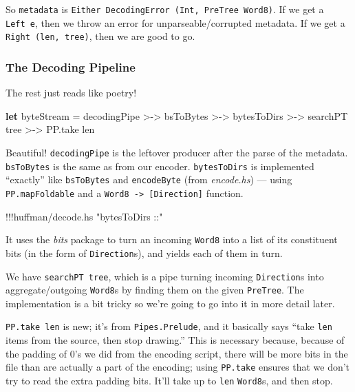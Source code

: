 \documentclass[]{article}
\newenvironment{Shaded}{}{}
\newcommand{\KeywordTok}[1]{\textcolor[rgb]{0.00,0.44,0.13}{\textbf{{#1}}}}
\newcommand{\StringTok}[1]{\textcolor[rgb]{0.25,0.44,0.63}{{#1}}}
\newcommand{\FunctionTok}[1]{\textcolor[rgb]{0.02,0.16,0.49}{{#1}}}
\newcommand{\NormalTok}[1]{{#1}}
\begin{document}
So \texttt{metadata} is
\texttt{Either\ DecodingError\ (Int,\ PreTree\ Word8)}. If we get a
\texttt{Left\ e}, then we throw an error for unparseable/corrupted
metadata. If we get a \texttt{Right\ (len,\ tree)}, then we are good to
go.

\subsubsection{The Decoding Pipeline}\label{the-decoding-pipeline}

The rest just reads like poetry!

\begin{Shaded}
\begin{Highlighting}[]
\KeywordTok{let} \NormalTok{byteStream }\FunctionTok{=} \NormalTok{decodingPipe }\FunctionTok{>->} \NormalTok{bsToBytes}
             \FunctionTok{>->} \NormalTok{bytesToDirs  }\FunctionTok{>->} \NormalTok{searchPT tree}
             \FunctionTok{>->} \NormalTok{PP.take len}
\end{Highlighting}
\end{Shaded}

Beautiful! \texttt{decodingPipe} is the leftover producer after the
parse of the metadata. \texttt{bsToBytes} is the same as from our
encoder. \texttt{bytesToDirs} is implemented ``exactly'' like
\texttt{bsToBytes} and \texttt{encodeByte} (from \emph{encode.hs}) ---
using \texttt{PP.mapFoldable} and a
\texttt{Word8\ -\textgreater{}\ {[}Direction{]}} function.

\begin{Shaded}
\begin{Highlighting}[]
\FunctionTok{!!!}\NormalTok{huffman}\FunctionTok{/}\NormalTok{decode}\FunctionTok{.}\NormalTok{hs }\StringTok{"bytesToDirs ::"}
\end{Highlighting}
\end{Shaded}

It uses the \emph{bits} package to turn an incoming \texttt{Word8} into
a list of its constituent bits (in the form of \texttt{Direction}s), and
yields each of them in turn.

We have \texttt{searchPT\ tree}, which is a pipe turning incoming
\texttt{Direction}s into aggregate/outgoing \texttt{Word8}s by finding
them on the given \texttt{PreTree}. The implementation is a bit tricky
so we're going to go into it in more detail later.

\texttt{PP.take\ len} is new; it's from \texttt{Pipes.Prelude}, and it
basically says ``take \texttt{len} items from the source, then stop
drawing.'' This is necessary because, because of the padding of 0's we
did from the encoding script, there will be more bits in the file than
are actually a part of the encoding; using \texttt{PP.take} ensures that
we don't try to read the extra padding bits. It'll take up to
\texttt{len} \texttt{Word8}s, and then stop.
\end{document}
